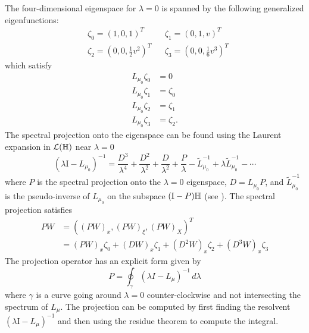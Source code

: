 The four-dimensional eigenspace for \(\lambda = 0\) is spanned by the following generalized eigenfunctions:
\begin{equation}
	\begin{aligned}
		&\zeta_0 = (1,0,1)^T  & &\zeta_1 = (0,1,v)^T \\
		&\zeta_2 = (0, 0, \frac 12 v^2)^T & &\zeta_3 = (0,0,\frac 1 6 v^3)^T
	\end{aligned}
\end{equation}
which satisfy
\begin{equation}
	\begin{aligned}
		L_{\mu_0} \zeta_0 &= 0 \\
		L_{\mu_0} \zeta_1 &= \zeta_0 \\
		L_{\mu_0} \zeta_2 &= \zeta_1 \\
		L_{\mu_0} \zeta_3 &= \zeta_2.
	\end{aligned}
\end{equation}
The spectral projection onto the eigenspace can be found using the Laurent expansion in \(\mathcal{L}(\mathbb{H})\) near \(\lambda = 0\)
\begin{equation}
	(\lambda \mathrm I - L_{\mu_0} )^{-1} = \frac{D^3}{\lambda^4} + \frac{D^2}{\lambda^2} + \frac{D}{\lambda^2} + \frac P \lambda - \tilde L _{\mu_0} ^{-1} + \lambda \tilde L_{\mu_0} ^{-1} - \cdots
\end{equation}
where \(P\) is the spectral projection onto the \(\lambda = 0\) eigenspace, \(D = L_{\mu_0} P\), and \(\tilde L _{\mu_0} ^{-1}\) is the pseudo-inverse of \(L_{\mu_0}\) on the subspace \((\mathrm I - P)\mathbb{H}\) (see \cite{kato2013perturbation}). The spectral projection satisfies
\begin{equation}
\begin{aligned}
	PW &= ((PW)_x, (PW)_\xi, (PW)_X)^T \\
	&= (PW)_x \zeta_0 + (DW)_x\zeta_1 + (D^2W)_x\zeta_2 + (D^3W)_x \zeta_3
\end{aligned}
\end{equation}
The projection operator has an explicit form given by 
\begin{equation}
	P = \oint_\gamma (\lambda I - L_\mu)^{-1} \, d\lambda
\end{equation}
where \(\gamma\) is a curve going around \(\lambda = 0\) counter-clockwise and not intersecting the spectrum of \(L_\mu\). The projection can be computed by first finding the resolvent \((\lambda \mathrm I - L_\mu)^{-1}\) and then using the residue theorem to compute the integral. 


